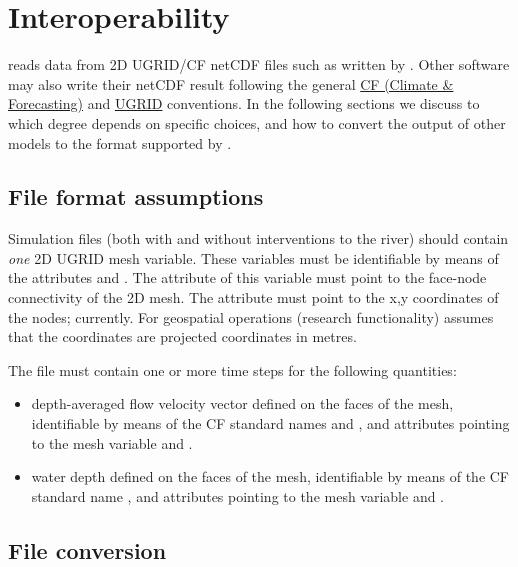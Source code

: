 \chapter{Interoperability} \label{Chp:Sim2Ugrid}

\dfastmi reads data from 2D UGRID/CF netCDF files such as written by \dflowfm.
Other software may also write their netCDF result following the general \href{https://cfconventions.org/}{CF (Climate \& Forecasting)} and \href{http://ugrid-conventions.github.io/ugrid-conventions/}{UGRID} conventions.
In the following sections we discuss to which degree \dfmi depends on \dflowfm specific choices, and how to convert the output of other models to the format supported by \dfmi.

\section{File format assumptions}

Simulation files (both with and without interventions to the river) should contain \emph{one} 2D UGRID mesh variable.
These variables must be identifiable by means of the attributes  and .
The  attribute of this variable must point to the face-node connectivity of the 2D mesh.
The  attribute must point to the x,y coordinates of the nodes; currently.
For geospatial operations (research functionality) \dfmi assumes that the coordinates are projected coordinates in metres.

The file must contain one or more time steps for the following quantities:
\begin{itemize}
\item depth-averaged flow velocity vector defined on the faces of the mesh, identifiable by means of the CF standard names  and , and attributes  pointing to the mesh variable and .
\item water depth defined on the faces of the mesh, identifiable by means of the CF standard name , and attributes  pointing to the mesh variable and .
\end{itemize}

\section{File conversion}

